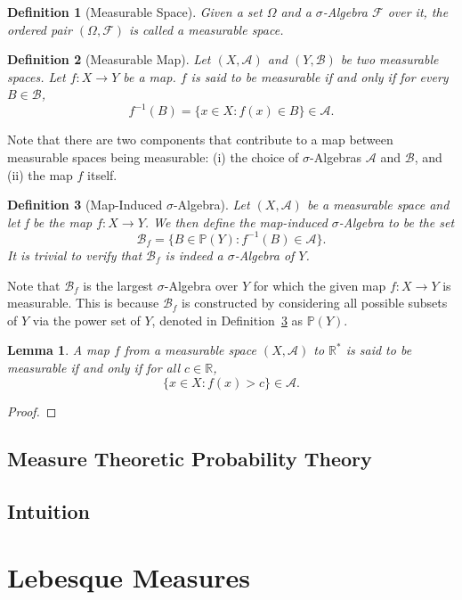 \documentclass[10pt, oneside]{article}
\newcommand{\R}{\mathbb{R}}
\newtheorem{defn}{Definition}
\newtheorem{lem}{Lemma}
\begin{document}
\begin{defn}[Measurable Space]
    \label{defn:space}
    Given a set $\Omega$ and a $\sigma$-Algebra $\mathcal{F}$ over it, the ordered 
    pair $(\Omega,\mathcal{F})$ is called a measurable space. 
\end{defn}

\begin{defn}[Measurable Map]
    \label{defn:map}
    Let $(X,\mathcal{A})$ and $(Y,\mathcal{B})$ be two measurable spaces. Let 
    $f \colon X \to Y$ be a map. $f$ is said to be measurable if and only if 
    for every $B \in \mathcal{B}$, 
    \[f^{-1}(B) = \{x \in X \colon f(x) \in B\} \in \mathcal{A}.\]
\end{defn}

Note that there are two components that contribute to a map between measurable spaces
being measurable: (i) the choice of $\sigma$-Algebras $\mathcal{A}$ and $\mathcal{B}$,
and (ii) the map $f$ itself. 

\begin{defn}[Map-Induced $\sigma$-Algebra]
    \label{defn:map-ind-SA}
    Let $(X,\mathcal{A})$ be a measurable space and let f be the map $f \colon X 
    \to Y$. We then define the map-induced $\sigma$-Algebra to be the set 
    \[\mathcal{B}_f = \{B \in \mathbb{P}(Y) \colon f^{-1}(B) \in \mathcal{A}\}. \]
    It is trivial to verify that $\mathcal{B}_f$ is indeed a $\sigma$-Algebra of $Y$. 
\end{defn}

Note that $\mathcal{B}_f$ is the largest $\sigma$-Algebra over $Y$ for which the 
given map $f \colon X \to Y$ is measurable. This is because $\mathcal{B}_f$ is 
constructed by considering all possible subsets of $Y$ via the power set of $Y$, 
denoted in Definition~\ref{defn:map-ind-SA} as $\mathbb{P}(Y)$. 

\begin{lem}
    A map $f$ from a measurable space $(X,\mathcal{A})$ to $\R^{*}$ is said to be 
    measurable if and only if for all $c \in \R$, 
    \[\{x \in X \colon f(x) > c\} \in \mathcal{A}. \]
\end{lem}

\begin{proof}
    
\end{proof}

\subsection{Measure Theoretic Probability Theory}

\subsection{Intuition}

\section{Lebesque Measures}
\end{document}
